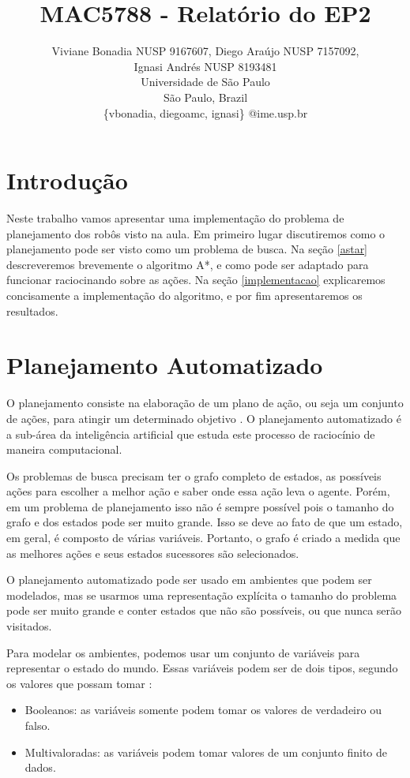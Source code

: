 \documentclass[12pt,a4paper]{article}
\title{MAC5788 - Relatório do EP2}
\author{Viviane Bonadia NUSP 9167607, Diego Ara\'{u}jo NUSP 7157092, \\ Ignasi Andr\'{e}s NUSP 8193481\\
Universidade de S\~{a}o Paulo\\
S\~{a}o Paulo, Brazil\\ \{vbonadia, diegoamc, ignasi\} @ime.usp.br}
\begin{document}
\maketitle

\section{Introdução}
Neste trabalho vamos apresentar uma implementação do problema de planejamento dos robôs visto na aula. 
Em primeiro lugar discutiremos como o planejamento pode ser visto como um problema de busca. 
Na seção \ref{astar} descreveremos brevemente o algoritmo A*, e como pode ser adaptado para funcionar raciocinando sobre as ações.
Na seção \ref{implementacao} explicaremos concisamente a implementação do algoritmo, e por fim apresentaremos os resultados.

\section{Planejamento Automatizado}\label{planejamentoBusca}
O planejamento consiste na elaboração de um plano de ação, ou seja um conjunto de ações, para atingir um determinado objetivo \cite{russell1995artificial}. 
O planejamento automatizado é a sub-área da inteligência artificial que estuda este processo de raciocínio de maneira computacional.

Os problemas de busca precisam ter o grafo completo de estados, as possíveis ações para escolher a melhor ação e saber onde essa ação leva o agente. 
Porém, em um problema de planejamento isso não é sempre possível pois o tamanho do grafo e dos estados pode ser muito grande. Isso se deve ao fato de que um estado, em geral, é composto de várias variáveis.
Portanto, o grafo é criado a medida que as melhores ações e seus estados sucessores são selecionados. 

O planejamento automatizado pode ser usado em ambientes que podem ser modelados, mas se usarmos uma representação explícita o tamanho do problema pode ser muito grande e conter estados que não são possíveis, ou que nunca serão visitados.

Para modelar os ambientes, podemos usar um conjunto de variáveis para representar o estado do mundo. 
Essas variáveis podem ser de dois tipos, segundo os valores que possam tomar \cite{geffner2013concise}:

\begin{itemize}
\item Booleanos: as variáveis somente podem tomar os valores de verdadeiro ou falso.
\item Multivaloradas: as variáveis podem tomar valores de um conjunto finito de dados.
\end{itemize}
\end{document}
